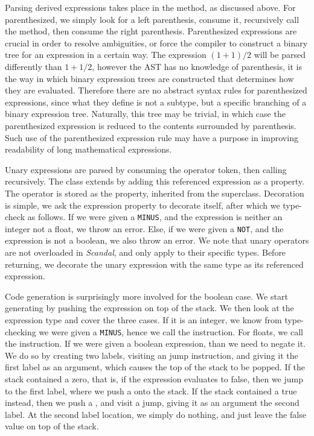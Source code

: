 Parsing derived expressions takes place in the  method, as discussed above. For parenthesized, we simply look for a left parenthesis, consume it, recursively call the  method, then consume the right parenthesis. Parenthesized expressions are crucial in order to resolve ambiguities, or force the compiler to construct a binary tree for an expression in a certain way. The expression $(1 + 1) / 2$ will be parsed differently than $1 + 1 / 2$, however the AST has no knowledge of parenthesis, it is the way in which binary expression trees are constructed that determines how they are evaluated. Therefore there are no abstract syntax rules for parenthesized expressions, since what they define is not a subtype, but a specific branching of a binary expression tree. Naturally, this tree may be trivial, in which case the parenthesized expression is reduced to the contents surrounded by parenthesis. Such use of the parenthesized expression rule may have a purpose in improving readability of long mathematical expressions.

Unary expressions are parsed by consuming the operator token, then calling  recursively. The  class extends  by adding this referenced expression as a property. The operator is stored as the  property, inherited from the superclass. Decoration is simple, we ask the expression property to decorate itself, after which we type-check as follows. If we were given a \texttt{MINUS}, and the expression is neither an integer not a float, we throw an error. Else, if we were given a \texttt{NOT}, and the expression is not a boolean, we also throw an error. We note that unary operators are not overloaded in \emph{Scandal}, and only apply to their specific types. Before returning, we decorate the unary expression with the same type as its referenced expression.

Code generation is surprisingly more involved for the boolean case. We start generating by pushing the expression on top of the stack. We then look at the expression type and cover the three cases. If it is an integer, we know from type-checking we were given a \texttt{MINUS}, hence we call the  instruction. For floats, we call the  instruction. If we were given a boolean expression, than we need to negate it. We do so by creating two labels, visiting an  jump instruction, and giving it the first label as an argument, which causes the top of the stack to be popped. If the stack contained a zero, that is, if the expression evaluates to false, then we jump to the first label, where we push a  onto the stack. If the stack contained a true instead, then we push a , and visit a  jump, giving it as an argument the second label. At the second label location, we simply do nothing, and just leave the false value on top of the stack.

